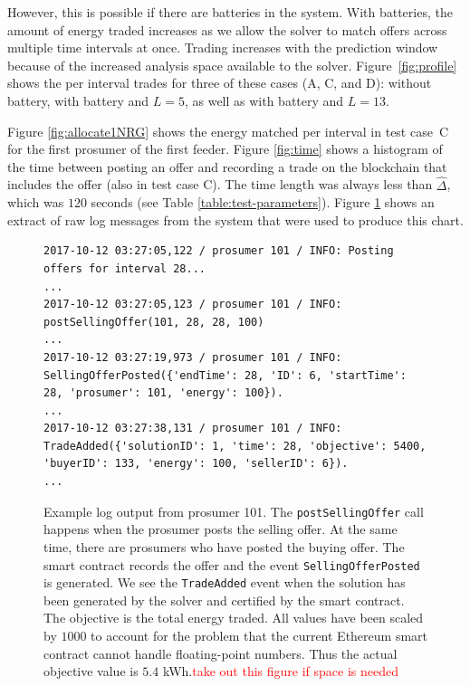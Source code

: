 However, this is possible if there are batteries in the system. With batteries, the amount of energy traded increases as we allow the solver to match offers across multiple time intervals at once. Trading increases with the prediction window because of the increased analysis space available to the solver.
Figure~\ref{fig:profile} shows the  per interval trades for three of these cases (A, C, and D): without battery, with battery and $L=5$, as well as with battery and $L=13$.  

Figure \ref{fig:allocate1NRG} shows the energy matched per interval in test case~C for the first prosumer of the first feeder. Figure \ref{fig:time} shows a histogram of the time between posting an offer and recording a trade on the blockchain that includes the offer (also in test case C). The time length was always less than $\hat{\Delta}$, which was $120$ seconds (see Table \ref{table:test-parameters}).
\ifShowLog
Figure \ref{fig:log} shows an extract of raw log messages from the system that were used to produce this chart.
\fi

\ifShowLog
{}

 
 \begin{figure}
 \begin{lstlisting}[language=log,numbers=none]
2017-10-12 03:27:05,122 / prosumer 101 / INFO: Posting offers for interval 28...
...
2017-10-12 03:27:05,123 / prosumer 101 / INFO: postSellingOffer(101, 28, 28, 100)
...
2017-10-12 03:27:19,973 / prosumer 101 / INFO: SellingOfferPosted({'endTime': 28, 'ID': 6, 'startTime': 28, 'prosumer': 101, 'energy': 100}).
...
2017-10-12 03:27:38,131 / prosumer 101 / INFO: TradeAdded({'solutionID': 1, 'time': 28, 'objective': 5400, 'buyerID': 133, 'energy': 100, 'sellerID': 6}).
...
 \end{lstlisting}
 \caption{Example log output from prosumer 101. The \texttt{postSellingOffer} call happens when the prosumer posts the selling offer. At the same time, there are prosumers who have posted the buying offer. The smart contract records the offer and the event \texttt{SellingOfferPosted} is generated. We see the \texttt{TradeAdded} event when the solution has been generated by the solver and certified by the smart contract. The objective is the total energy traded. All values have been scaled by $1000$ to account for the problem that the current Ethereum smart contract cannot handle floating-point numbers. Thus the actual objective value is $5.4$ kWh.\textcolor{red}{take out this figure if space is needed}}
 \label{fig:log}
 \end{figure}
\fi

